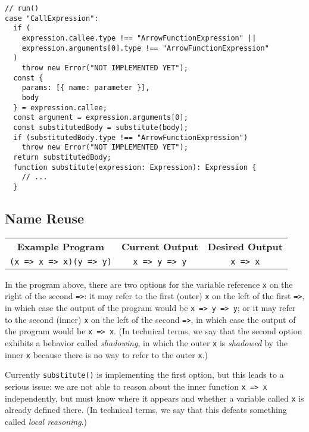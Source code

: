 \documentclass[12pt, oneside]{book}
\begin{document}
\begin{verbatim}
// run()
case "CallExpression":
  if (
    expression.callee.type !== "ArrowFunctionExpression" ||
    expression.arguments[0].type !== "ArrowFunctionExpression"
  )
    throw new Error("NOT IMPLEMENTED YET");
  const {
    params: [{ name: parameter }],
    body
  } = expression.callee;
  const argument = expression.arguments[0];
  const substitutedBody = substitute(body);
  if (substitutedBody.type !== "ArrowFunctionExpression")
    throw new Error("NOT IMPLEMENTED YET");
  return substitutedBody;
  function substitute(expression: Expression): Expression {
    // ...
  }
\end{verbatim}

\subsection{Name Reuse}

\begin{center}
\begin{tabular}{c|c|c}
\textbf{Example Program} & \textbf{Current Output} & \textbf{Desired Output} \\
\texttt{(x => x => x)(y => y)} & \texttt{x => y => y} & \texttt{x => x} \\
\end{tabular}
\end{center}

\noindent In the program above, there are two options for the variable reference \texttt{x} on the right of the second \texttt{=>}: it may refer to the first (outer) \texttt{x} on the left of the first \texttt{=>}, in which case the output of the program would be \texttt{x => y => y}; or it may refer to the second (inner) \texttt{x} on the left of the second \texttt{=>}, in which case the output of the program would be \texttt{x => x}. (In technical terms, we say that the second option exhibits a behavior called \emph{shadowing}, in which the outer \texttt{x} is \emph{shadowed} by the inner \texttt{x} because there is no way to refer to the outer \texttt{x}.)

Currently \texttt{substitute()} is implementing the first option, but this leads to a serious issue: we are not able to reason about the inner function \texttt{x => x} independently, but must know where it appears and whether a variable called \texttt{x} is already defined there. (In technical terms, we say that this defeats something called \emph{local reasoning}.)
\end{document}
